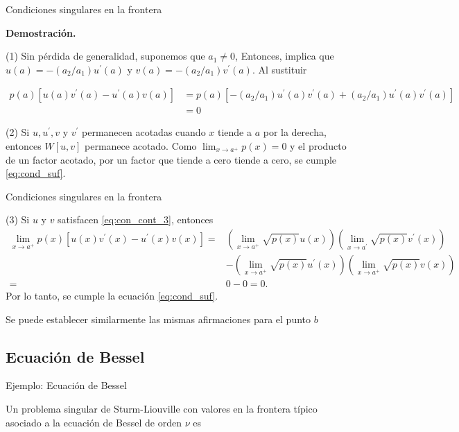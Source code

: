  
  
{Condiciones singulares en la frontera}


\textbf{Demostración.}

(1) Sin pérdida de generalidad, suponemos que $a_{1} \neq 0$, Entonces,  implica que $u(a)=-\left(a_{2} / a_{1}\right) u^{\prime}(a)$ y $v(a)=-\left(a_{2} / a_{1}\right) v^{\prime}(a)$. Al sustituir

$$
\begin{aligned}
p(a)\left[u(a) v^{\prime}(a)-u^{\prime}(a) v(a)\right] &=p(a)\left[-\left(a_{2} / a_{1}\right) u^{\prime}(a) v^{\prime}(a)+\left(a_{2} / a_{1}\right) u^{\prime}(a) v^{\prime}(a)\right] \\
&=0
\end{aligned}
$$


(2)  Si $u, u^{\prime}, v$ y $ v^{\prime}$ permanecen acotadas cuando $x$ tiende a $a$ por la derecha, entonces  $W[u,v]$ permanece acotado. Como $\lim_{x \rightarrow a^{+}} p(x)=0$ y el producto de un factor acotado, por un factor que tiende a cero tiende a cero,  se cumple \eqref{eq:cond_suf}.





 
  
{Condiciones singulares en la frontera}

(3) Si $u$ y $v$ satisfacen \eqref{eq:con_cont_3}, entonces 
$$
\begin{aligned}
\lim _{x \rightarrow a^{+}} p(x)\left[u(x) v^{\prime}(x)-u^{\prime}(x) v(x)\right]=&\left(\lim _{x \rightarrow a^{+}} \sqrt{p(x)} u(x)\right)\left(\lim _{x \rightarrow a^{\prime}} \sqrt{p(x)} v^{\prime}(x)\right) \\
&-\left(\lim _{x \rightarrow a^{+}} \sqrt{p(x)} u^{\prime}(x)\right)\left(\lim _{x \rightarrow a^{+}} \sqrt{p(x)} v(x)\right) \\
=& 0-0=0 .
\end{aligned}
$$
Por lo tanto, se cumple la ecuación \eqref{eq:cond_suf}.


Se puede establecer  similarmente las mismas afirmaciones para el punto $b$ 

 

 \subsection{ Ecuación de Bessel}
 
{Ejemplo: Ecuación de Bessel}
 
Un problema singular de Sturm-Liouville con valores en la frontera típico asociado a la ecuación de Bessel de orden $\nu$ es

